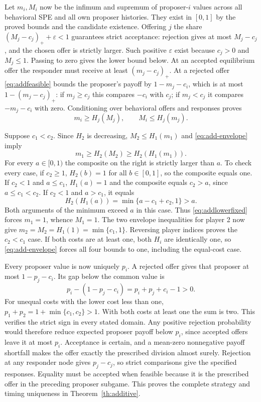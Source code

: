 \documentclass[11pt]{article}
\newcommand{\pos}[1]{\left(#1\right)_{+}}
\begin{document}
Let $m_i,M_i$ now be the infimum and supremum of proposer-$i$ values across all behavioral SPE and all own proposer histories. They exist in $[0,1]$ by the proved bounds and the candidate existence. Offering $j$ the share $\pos{M_j-c_j}+\varepsilon<1$ guarantees strict acceptance: rejection gives at most $M_j-c_j$, and the chosen offer is strictly larger. Such positive $\varepsilon$ exist because $c_j>0$ and $M_j\le1$. Passing to zero gives the lower bound below. At an accepted equilibrium offer the responder must receive at least $\pos{m_j-c_j}$. At a rejected offer \eqref{eq:addfeasible} bounds the proposer's payoff by $1-m_j-c_i$, which is at most $1-\pos{m_j-c_j}$: if $m_j\ge c_j$ this compares $-c_i$ with $c_j$; if $m_j<c_j$ it compares $-m_j-c_i$ with zero. Conditioning over behavioral offers and responses proves
\begin{equation}\label{eq:add-envelope}
 m_i\ge H_j(M_j),\qquad M_i\le H_j(m_j).
\end{equation}

Suppose $c_1<c_2$. Since $H_2$ is decreasing, $M_2\le H_1(m_1)$ and \eqref{eq:add-envelope} imply
\begin{equation}\label{eq:addlowerfixed}
 m_1\ge H_2(M_2)\ge H_2(H_1(m_1)).
\end{equation}
For every $a\in[0,1)$ the composite on the right is strictly larger than $a$. To check every case, if $c_2\ge1$, $H_2(b)=1$ for all $b\in[0,1]$, so the composite equals one. If $c_2<1$ and $a\le c_1$, $H_1(a)=1$ and the composite equals $c_2>a$, since $a\le c_1<c_2$. If $c_2<1$ and $a>c_1$, it equals
\begin{equation}
 H_2(H_1(a))=\min\{a-c_1+c_2,1\}>a.
\end{equation}
Both arguments of the minimum exceed $a$ in this case. Thus \eqref{eq:addlowerfixed} forces $m_1=1$, whence $M_1=1$. The two envelope inequalities for player 2 now give $m_2=M_2=H_1(1)=\min\{c_1,1\}$. Reversing player indices proves the $c_2<c_1$ case. If both costs are at least one, both $H_i$ are identically one, so \eqref{eq:add-envelope} forces all four bounds to one, including the equal-cost case.

Every proposer value is now uniquely $p_i$. A rejected offer gives that proposer at most $1-p_j-c_i$. Its gap below the common value is
\begin{equation}\label{eq:addgap}
 p_i-(1-p_j-c_i)=p_i+p_j+c_i-1>0.
\end{equation}
For unequal costs with the lower cost less than one, $p_1+p_2=1+\min\{c_1,c_2\}>1$. With both costs at least one the sum is two. This verifies the strict sign in every stated domain. Any positive rejection probability would therefore reduce expected proposer payoff below $p_i$, since accepted offers leave it at most $p_i$. Acceptance is certain, and a mean-zero nonnegative payoff shortfall makes the offer exactly the prescribed division almost surely. Rejection at any responder node gives $p_j-c_j$, so strict comparisons give the specified responses. Equality must be accepted when feasible because it is the prescribed offer in the preceding proposer subgame. This proves the complete strategy and timing uniqueness in Theorem~\ref{th:additive}.
\end{document}
